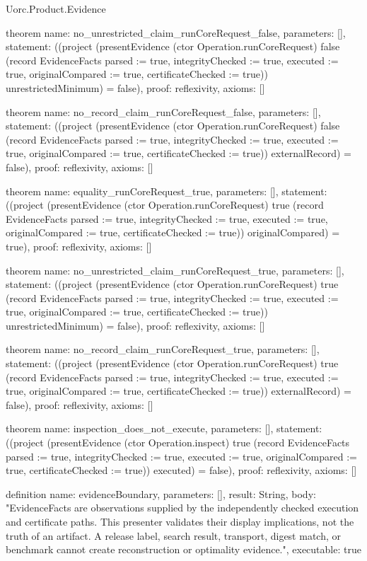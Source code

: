 \begin{lexlean}{Uorc.Product.Evidence}
\begin{semanticmodule}
theorem{
  name: no_unrestricted_claim_runCoreRequest_false,
  parameters: [],
  statement: ((project (presentEvidence (ctor Operation.runCoreRequest) false (record EvidenceFacts {parsed := true, integrityChecked := true, executed := true, originalCompared := true, certificateChecked := true})) unrestrictedMinimum) = false),
  proof: reflexivity{},
  axioms: []
}

theorem{
  name: no_record_claim_runCoreRequest_false,
  parameters: [],
  statement: ((project (presentEvidence (ctor Operation.runCoreRequest) false (record EvidenceFacts {parsed := true, integrityChecked := true, executed := true, originalCompared := true, certificateChecked := true})) externalRecord) = false),
  proof: reflexivity{},
  axioms: []
}

theorem{
  name: equality_runCoreRequest_true,
  parameters: [],
  statement: ((project (presentEvidence (ctor Operation.runCoreRequest) true (record EvidenceFacts {parsed := true, integrityChecked := true, executed := true, originalCompared := true, certificateChecked := true})) originalCompared) = true),
  proof: reflexivity{},
  axioms: []
}

theorem{
  name: no_unrestricted_claim_runCoreRequest_true,
  parameters: [],
  statement: ((project (presentEvidence (ctor Operation.runCoreRequest) true (record EvidenceFacts {parsed := true, integrityChecked := true, executed := true, originalCompared := true, certificateChecked := true})) unrestrictedMinimum) = false),
  proof: reflexivity{},
  axioms: []
}

theorem{
  name: no_record_claim_runCoreRequest_true,
  parameters: [],
  statement: ((project (presentEvidence (ctor Operation.runCoreRequest) true (record EvidenceFacts {parsed := true, integrityChecked := true, executed := true, originalCompared := true, certificateChecked := true})) externalRecord) = false),
  proof: reflexivity{},
  axioms: []
}

theorem{
  name: inspection_does_not_execute,
  parameters: [],
  statement: ((project (presentEvidence (ctor Operation.inspect) true (record EvidenceFacts {parsed := true, integrityChecked := true, executed := true, originalCompared := true, certificateChecked := true})) executed) = false),
  proof: reflexivity{},
  axioms: []
}

definition{
  name: evidenceBoundary,
  parameters: [],
  result: String,
  body: "EvidenceFacts are observations supplied by the independently checked execution and certificate paths. This presenter validates their display implications, not the truth of an artifact. A release label, search result, transport, digest match, or benchmark cannot create reconstruction or optimality evidence.",
  executable: true
}


\end{semanticmodule}
\end{lexlean}
